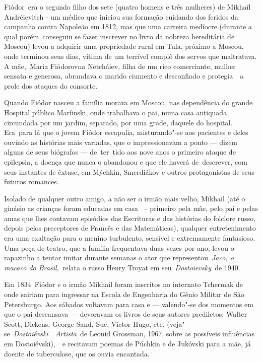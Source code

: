 Fiódor~era o segundo filho dos sete (quatro homens e três mulheres) de
Mikhaíl Andréievitch - um médico que iniciou sua formação cuidando dos
feridos da campanha contra Napoleão em 1812, mas que uma carreira
medíocre (durante a qual porém~conseguiu se fazer inscrever no livro da
nobreza hereditária de Moscou) levou a adquirir uma propriedade rural em
Tula, próximo a Moscou, onde terminou seus dias, vítima de um terrível
complô dos servos que maltratava. A mãe,~Maria Fiódorovna Netcháiev,
filha de um rico comerciante, mulher sensata e generosa, abrandava o
marido ciumento e desconfiado e protegia~~a prole dos ataques do
consorte.

Quando Fiódor nasceu a família morava em Moscou, nas dependência do
grande Hospital público Maríinski, onde trabalhava o pai, numa casa
antiquada circundada por um jardim, separado, por uma grade, daquele do
hospital. Era~para lá que o jovem Fiódor escapulia, misturando"-se aos
pacientes e deles ouvindo as histórias mais variadas, que o
impressionavam a ponto --- dizem alguns de seus biógrafos --- de~ter~tido
aos nove anos o primeiro ataque de epilepsia, a doença que nunca o
abandonou e que ele haverá de~descrever, com seus instantes de êxtase,
em Mýchkin, Smerdiákov e outros protagonistas de seus futuros romances.

Isolado de qualquer outro amigo, a não ser o irmão mais velho, Mikhail
(até o ginásio as crianças foram educadas em casa~~- primeiro pela mãe,
pelo pai e pelas amas que lhes contavam episódios das Escrituras e das
histórias do folclore russo, depois pelos preceptores de Francês e das
Matemáticas), qualquer entretenimento era uma exaltação para o menino
turbulento, sensível e extremamente fantasioso. Uma peça de teatro, que
a família frequentava duas vezes por ano, levou o rapazinho a tentar
imitar durante semanas o ator que representou~\emph{Jaco, o macaco do
Brasil,~}relata o russo Henry Troyat em seu~\emph{Dostoievsky~}de 1940.

Em 1834~Fiódor e o irmão Mikhail foram inscritos no internato Tchermak
de onde sairiam para ingressar na Escola de Engenharia do Gênio Militar
de São Petersburgo. Aos sábados voltavam para casa e --- valendo"-se dos
momentos em que o pai descansava --- devoravam os livros de seus autores
prediletos: Walter Scott, Dickens, George Sand, Sue, Victor Hugo, etc.
(veja"-se~\emph{Dostoiévski~~Artista}~de Leonid Grossman, 1967, sobre as
possíveis influências em Dostoiévski),~~e recitavam poemas de Púchkin e
de Jukóvski para a mãe, já doente de tuberculose, que os ouvia
encantada.

